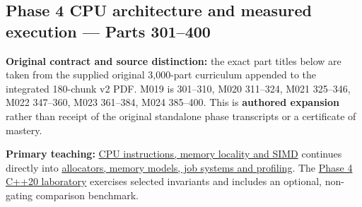 \subsection{Phase 4 CPU architecture and measured execution --- Parts 301--400}\label{appendix-fd090d982a15-phase-4-cpu-architecture-and-measured-execution-parts-301400}

\hypertarget{appendix-fd090d982a15-phase-4-cpu-architecture-and-measured-execution-parts-301400}{}

\textbf{Original contract and source distinction:} the exact part titles below are taken from the supplied original 3,000-part curriculum appended to the integrated 180-chunk v2 PDF. M019 is 301--310, M020 311--324, M021 325--346, M022 347--360, M023 361--384, M024 385--400. This is \textbf{authored expansion} rather than receipt of the original standalone phase transcripts or a certificate of mastery.

\textbf{Primary teaching:} \hyperref[01-foundations-i-ch007-from-a-correct-c-asset-service-to-the-instructions-a-cpu-can-execute-phase-4-m019m021-parts-301346]{CPU instructions, memory locality and SIMD} continues directly into \hyperref[01-foundations-i-ch007-from-temporary-memory-to-finished-parallel-frames-phase-4-m022m024-parts-347400]{allocators, memory models, job systems and profiling}. The \hyperref[source-file-0060a91bd24dd25d6c14e679]{Phase 4 C++20 laboratory} exercises selected invariants and includes an optional, non-gating comparison benchmark.

